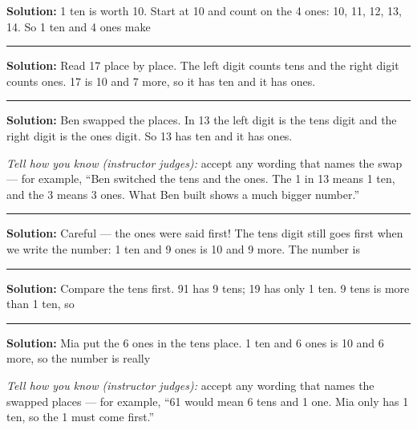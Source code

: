 \documentclass[12pt]{article}
\begin{document}



\textbf{Solution:} 1 ten is worth 10. Start at 10 and count on the 4 ones:
10, 11, 12, 13, 14. So 1 ten and 4 ones make 

\vspace{0.3cm}\noindent\rule{\linewidth}{0.2pt}\vspace{0.1cm}


\textbf{Solution:} Read 17 place by place. The left digit counts tens and the
right digit counts ones. 17 is 10 and 7 more, so it has  ten
and it has  ones.

\vspace{0.3cm}\noindent\rule{\linewidth}{0.2pt}\vspace{0.1cm}


\textbf{Solution:} Ben swapped the places. In 13 the left digit is the tens
digit and the right digit is the ones digit. So 13 has  ten
and it has  ones.

\emph{Tell how you know (instructor judges):} accept any wording that names
the swap --- for example, ``Ben switched the tens and the ones. The 1 in 13
means 1 ten, and the 3 means 3 ones. What Ben built shows a much bigger
number.''

\vspace{0.3cm}\noindent\rule{\linewidth}{0.2pt}\vspace{0.1cm}


\textbf{Solution:} Careful --- the ones were said first! The tens digit still
goes first when we write the number: 1 ten and 9 ones is 10 and 9 more. The
number is 

\vspace{0.3cm}\noindent\rule{\linewidth}{0.2pt}\vspace{0.1cm}


\textbf{Solution:} Compare the tens first. 91 has 9 tens; 19 has only 1 ten.
9 tens is more than 1 ten, so 

\vspace{0.3cm}\noindent\rule{\linewidth}{0.2pt}\vspace{0.1cm}


\textbf{Solution:} Mia put the 6 ones in the tens place. 1 ten and 6 ones is
10 and 6 more, so the number is really 

\emph{Tell how you know (instructor judges):} accept any wording that names
the swapped places --- for example, ``61 would mean 6 tens and 1 one. Mia only
has 1 ten, so the 1 must come first.''
\end{document}
